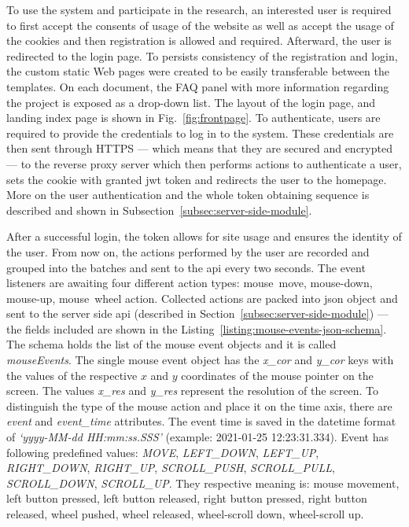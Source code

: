 To use the system and participate in the research, an interested user is required to first accept the consents of usage of the website as well as accept the usage of the cookies and then registration is allowed and required. Afterward, the user is redirected to the login page.
To persists consistency of the registration and login, the custom static Web pages were created to be easily transferable between the templates.
On each document, the FAQ panel with more information regarding the project is exposed as a drop-down list.
The layout of the login page, and landing index page is shown in Fig.~\ref{fig:frontpage}.
To authenticate, users are required to provide the credentials to log in to the system.
These credentials are then sent through HTTPS --- which means that they are secured and encrypted --- to the reverse proxy server which then performs actions to authenticate a user, sets the cookie with granted \gls{jwt} token and redirects the user to the homepage.
More on the user authentication and the whole token obtaining sequence is described and shown in Subsection~\ref{subsec:server-side-module}.

After a successful login, the token allows for site usage and ensures the identity of the user.
From now on, the actions performed by the user are recorded and grouped into the batches and sent to the \gls{api} every two seconds.
The event listeners are awaiting four different action types: \mbox{mouse move}, \mbox{mouse-down}, \mbox{mouse-up}, \mbox{mouse wheel} action.
Collected actions are packed into \gls{json} object and sent to the server side \gls{api} (described in Section~\ref{subsec:server-side-module}) --- the fields included are shown in the Listing~\ref{listing:mouse-events-json-schema}.
The schema holds the list of the mouse event objects and it is called \textit{mouseEvents}.
The single mouse event object has the \textit{x\_cor} and \textit{y\_cor} keys with the values of the respective $x$ and $y$ coordinates of the mouse pointer on the screen.
The values \textit{x\_res} and \textit{y\_res} represent the resolution of the screen.
To distinguish the type of the mouse action and place it on the time axis, there are \textit{event} and \textit{event\_time} attributes.
The event time is saved in the datetime format of \textit{`yyyy-MM-dd HH:mm:ss.SSS'} (example: 2021-01-25 12:23:31.334).
Event has following predefined values: \textit{MOVE}, \textit{LEFT\_DOWN}, \textit{LEFT\_UP}, \textit{RIGHT\_DOWN}, \textit{RIGHT\_UP}, \textit{SCROLL\_PUSH}, \textit{SCROLL\_PULL}, \textit{SCROLL\_DOWN}, \textit{SCROLL\_UP}\@.
They respective meaning is: mouse movement, left button pressed, left button released, right button pressed, right button released, wheel pushed, wheel released, wheel-scroll down, wheel-scroll up.



